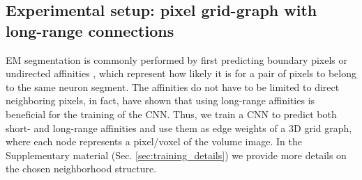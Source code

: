 \subsection{Experimental setup: pixel grid-graph with long-range connections} \label{sec:grid_graph}
EM segmentation is commonly performed by first predicting 
boundary pixels \cite{beier2017multicut,ciresan2012deep} or undirected affinities \cite{wolf2018mutex,lee2017superhuman,funke2018large}, which represent how likely it is for a pair of pixels to belong to the same neuron segment. 
The affinities do not have to be limited to direct neighboring pixels, in fact, \cite{lee2017superhuman} have shown that using long-range affinities is beneficial for the training of the CNN. 
Thus, we train a CNN to predict both short- and long-range affinities
and use them as edge weights of a 3D grid graph, where each node represents a pixel/voxel of the volume image. 
In the Supplementary material (Sec. \ref{sec:training_details}) we provide more details on the chosen neighborhood structure.

